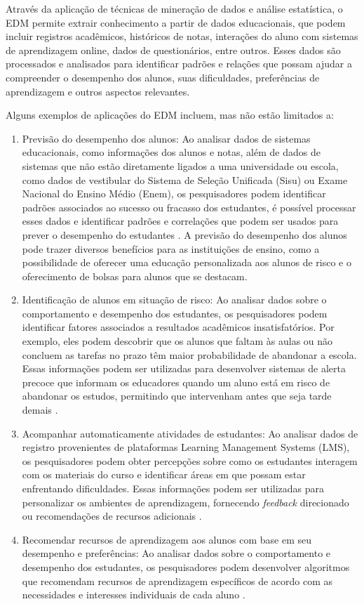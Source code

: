 Através da aplicação de técnicas de mineração de dados e análise estatística, o EDM permite extrair conhecimento a partir de dados educacionais, que podem incluir registros acadêmicos, históricos de notas, interações do aluno com sistemas de aprendizagem online, dados de questionários, entre outros. Esses dados são processados e analisados para identificar padrões e relações que possam ajudar a compreender o desempenho dos alunos, suas dificuldades, preferências de aprendizagem e outros aspectos relevantes.

Alguns exemplos de aplicações do EDM incluem, mas não estão limitados a:

\begin{enumerate}
    \item Previsão do desempenho dos alunos: Ao analisar dados de sistemas educacionais, como informações dos alunos e notas, além de dados de sistemas que não estão diretamente ligados a uma universidade ou escola, como dados de vestibular do Sistema de Seleção Unificada (Sisu) ou Exame Nacional do Ensino Médio (Enem), os pesquisadores podem identificar padrões associados ao sucesso ou fracasso dos estudantes, é possível processar esses dados e identificar padrões e correlações que podem ser usados para prever o desempenho do estudantes \cite{avaandparpinelli:2020}. A previsão do desempenho dos alunos pode trazer diversos benefícios para as instituições de ensino, como a possibilidade de oferecer uma educação personalizada aos alunos de risco e o oferecimento de bolsas para alunos que se destacam.

    \item Identificação de alunos em situação de risco: Ao analisar dados sobre o comportamento e desempenho dos estudantes, os pesquisadores podem identificar fatores associados a resultados acadêmicos insatisfatórios. Por exemplo, eles podem descobrir que os alunos que faltam às aulas ou não concluem as tarefas no prazo têm maior probabilidade de abandonar a escola. Essas informações podem ser utilizadas para desenvolver sistemas de alerta precoce que informam os educadores quando um aluno está em risco de abandonar os estudos, permitindo que intervenham antes que seja tarde demais \cite{ramos:2020}.

    \item Acompanhar automaticamente atividades de estudantes: Ao analisar dados de registro provenientes de plataformas Learning Management Systems (LMS), os pesquisadores podem obter percepções sobre como os estudantes interagem com os materiais do curso e identificar áreas em que possam estar enfrentando dificuldades. Essas informações podem ser utilizadas para personalizar os ambientes de aprendizagem, fornecendo \textit{feedback} direcionado ou recomendações de recursos adicionais \cite{Santos2019}.

    \item Recomendar recursos de aprendizagem aos alunos com base em seu desempenho e preferências: Ao analisar dados sobre o comportamento e desempenho dos estudantes, os pesquisadores podem desenvolver algoritmos que recomendam recursos de aprendizagem específicos de acordo com as necessidades e interesses individuais de cada aluno \cite{9637207}.
\end{enumerate}

